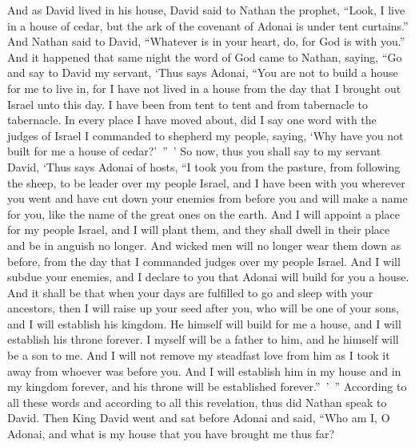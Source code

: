 \begin{biblechapter} %
 And as David lived in his house, David said to Nathan the prophet, “Look, I live in a house of cedar, but the ark of the covenant of Adonai is under tent curtains.”
\verse And Nathan said to David, “Whatever is in your heart, do, for God is with you.”
\verse And it happened that same night the word of God came to Nathan, saying,
\verse “Go and say to David my servant, ‘Thus says Adonai, “You are not to build a house for me to live in,
\verse for I have not lived in a house from the day that I brought out Israel unto this day. I have been from tent to tent and from tabernacle to tabernacle.
\verse In every place I have moved about, did I say one word with the judges of Israel I commanded to shepherd my people, saying, ‘Why have you not built for me a house of cedar?’ ” ’
\verse So now, thus you shall say to my servant David, ‘Thus says Adonai of hosts, “I took you from the pasture, from following the sheep, to be leader over my people Israel,
\verse and I have been with you wherever you went and have cut down your enemies from before you and will make a name for you, like the name of the great ones on the earth.
\verse And I will appoint a place for my people Israel, and I will plant them, and they shall dwell in their place and be in anguish no longer. And wicked men will no longer wear them down as before,
\verse from the day that I commanded judges over my people Israel. And I will subdue your enemies, and I declare to you that Adonai will build for you a house.
\verse And it shall be that when your days are fulfilled to go and sleep with your ancestors, then I will raise up your seed after you, who will be one of your sons, and I will establish his kingdom.
\verse He himself will build for me a house, and I will establish his throne forever.
\verse I myself will be a father to him, and he himself will be a son to me. And I will not remove my steadfast love from him as I took it away from whoever was before you.
\verse And I will establish him in my house and in my kingdom forever, and his throne will be established forever.” ’ ”
\verse According to all these words and according to all this revelation, thus did Nathan speak to David.
 Then King David went and sat before Adonai and said, “Who am I, O Adonai, and what is my house that you have brought me thus far?

\end{biblechapter}
